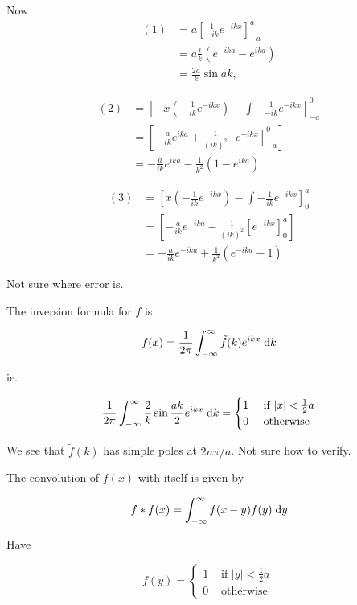 \documentclass[a4paper]{article}
\begin{document}
Now \begin{align*}
(1) & = a \left[ \frac{1}{-ik} e^{-ikx}  \right]_{-a}^{a} \\
& = a \frac{i}{k} \left(  e^{-ika} - e^{ika} \right) \\
& = \frac{2a}{k} \sin a k,
\end{align*}


\begin{align*}
(2) & = \left[  -x \left( - \frac{1}{ik} e^{-ikx} \right) - \int - \frac{1}{- ik} e^{-ikx}  \right]_{-a}^{0} \\
& = \left[  - \frac{a}{ik} e^{ika} + \frac{1}{(ik)^{2}} \left[ e^{-ikx} \right]_{-a}^{0} \right] \\
& = - \frac{a}{ik} e^{ika} - \frac{1}{k^{2}} \left(  1 - e^{ika} \right) 
\end{align*}

\begin{align*}
(3) & = \left[ x \left( - \frac{1}{ik} e^{-ikx} \right) - \int - \frac{1}{ik} e^{-ikx}  \right]_{0}^{a} \\
& = \left[  - \frac{a}{ik} e^{-ika} - \frac{1}{(ik)^{2}} \left[ e^{-ikx} \right]_{0}^{a} \right] \\
& = - \frac{a}{ik} e^{-ika} + \frac{1}{k^{2}} \left( e^{-ika} - 1 \right) 
\end{align*}

Not sure where error is.

The inversion formula for $ f $ is

\[ f(x) = \frac{1}{2 \pi} \int_{-\infty}^{\infty} \tilde{f}(k) e^{ikx} \; \mathrm{d} k \]

ie. 

\[  \frac{1}{2 \pi} \int_{-\infty}^{\infty} \frac{2}{k} \sin \frac{ak}{2} e^{ikx} \; \mathrm{d} k = \begin{cases} 1  & \text{ if } | x | < \frac{1}{2} a \\ 0 & \text{ otherwise } \end{cases} \]


We see that $ \tilde{f}(k) $ has simple poles at $ 2 n \pi / a $. Not sure how to verify.

The convolution of $ f(x) $ with itself is given by

\begin{align*}
f * f(x) & = \int_{-\infty}^{\infty} f(x-y)f(y) \; \mathrm{d} y  \\
\end{align*}

Have 

\[ f(y) = \begin{cases} 1  & \text{ if } | y | < \frac{1}{2} a \\ 0 & \text{ otherwise } \end{cases} \]
\end{document}
